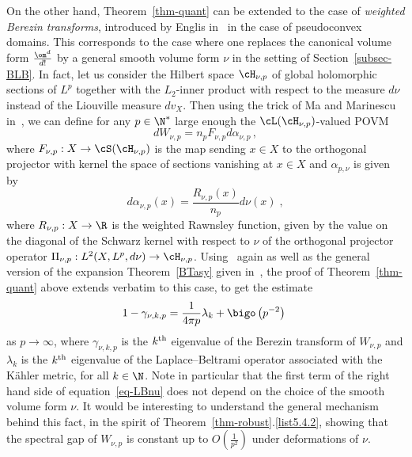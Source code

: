 \begin{rema}\label{weightedBT}
On the other hand, Theorem~\ref{thm-quant} can be extended to the case of \emph{weighted Berezin transforms}, introduced by Englis in~\cite{E00} in the case of pseudoconvex domains. This corresponds to the case where one replaces the canonical volume form $\frac{\om^d}{d!}$ by a general smooth volume form $\nu$ in the setting of Section~\ref{subsec-BLB}. In fact, let us consider the Hilbert space $\cH_{\nu,p}$ of global holomorphic sections of $L^p$ together with the $L_2$-inner product with respect to the measure $d\nu$ instead of the Liouville measure $dv_X$. Then using the trick of Ma and Marinescu in~\cite[Section~4.1.9]{MM07}, we can define for any $p\in\N^*$ large enough the $\cL(\cH_{\nu,p})$-valued POVM
\begin{equation}\label{Wnup}
dW_{\nu,p}=n_pF_{\nu,p}d\alpha_{\nu,p}\,,
\end{equation}
where $F_{\nu,p}:X\rightarrow\cS(\cH_{\nu,p})$ is the map sending $x\in X$ to the orthogonal projector with kernel the space of sections vanishing at $x\in X$ and $\alpha_{p,\nu}$ is given by
\begin{equation}\label{eq-alphahbarnu}
d\alpha_{\nu,p}(x) = \frac{R_{\nu,p}(x)}{n_p}d\nu(x)\;,
\end{equation}
where $R_{\nu,p}:X\rightarrow\R$ is the weighted Rawnsley function, given by the value on the diagonal of the Schwarz kernel with respect to $\nu$ of the orthogonal projector operator $\Pi_{\nu,p}:L^2(X,L^p,d\nu)\rightarrow\cH_{\nu,p}$. Using~\cite[Section~4.19]{MM07} again as well as the general version of the expansion Theorem~\ref{BTasy} given in~\cite[Theorem~4.18']{DLM06}, the proof of Theorem~\ref{thm-quant} above extends verbatim to this case, to get the estimate
\begin{equation}\label{eq-LBnu}
1-\gamma_{\nu,k,p} =\frac{1}{4\pi p}\lambda_k + \bigo\left(p^{-2}\right)\;
\end{equation}
as $p\rightarrow\infty$, where $\gamma_{\nu,k,p}$ is the $k^{\rm th}$ eigenvalue of the Berezin transform of $W_{\nu,p}$ and $\lambda_k$ is the $k^{\rm th}$ eigenvalue of the Laplace--Beltrami operator associated with the K\"ahler metric, for all $k\in\N$. Note in particular that the first term of the right hand side of equation~\eqref{eq-LBnu} does not depend on the choice of the smooth volume form $\nu$. It would be interesting to understand the general mechanism behind this fact, in the spirit of Theorem~\ref{thm-robust}.\eqref{list5.4.2}, showing that the spectral gap of $W_{\nu,p}$ is constant up to $O(\frac{1}{p^2})$ under deformations of $\nu$.
\end{rema}

